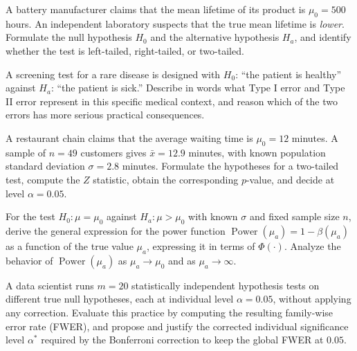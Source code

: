 \begin{problema}\label{prob:ddb67d0}
A battery manufacturer claims that the mean lifetime of its product is $\mu_0=500$ hours. An independent laboratory suspects that the true mean lifetime is \emph{lower}. Formulate the null hypothesis $H_0$ and the alternative hypothesis $H_a$, and identify whether the test is left-tailed, right-tailed, or two-tailed.
\end{problema}

\begin{problema}\label{prob:78013c6}
A screening test for a rare disease is designed with $H_0$: ``the patient is healthy'' against $H_a$: ``the patient is sick.'' Describe in words what Type I error and Type II error represent in this specific medical context, and reason which of the two errors has more serious practical consequences.
\end{problema}

\begin{problema}\label{prob:74dc84f}
A restaurant chain claims that the average waiting time is $\mu_0=12$ minutes. A sample of $n=49$ customers gives $\bar x=12.9$ minutes, with known population standard deviation $\sigma=2.8$ minutes. Formulate the hypotheses for a two-tailed test, compute the $Z$ statistic, obtain the corresponding $p$-value, and decide at level $\alpha=0.05$.
\end{problema}

\begin{problema}\label{prob:fad6841}
For the test $H_0:\mu=\mu_0$ against $H_a:\mu>\mu_0$ with known $\sigma$ and fixed sample size $n$, derive the general expression for the power function $\operatorname{Power}(\mu_a)=1-\beta(\mu_a)$ as a function of the true value $\mu_a$, expressing it in terms of $\Phi(\cdot)$. Analyze the behavior of $\operatorname{Power}(\mu_a)$ as $\mu_a\to\mu_0$ and as $\mu_a\to\infty$.
\end{problema}

\begin{problema}\label{prob:66368eb}
A data scientist runs $m=20$ statistically independent hypothesis tests on different true null hypotheses, each at individual level $\alpha=0.05$, without applying any correction. Evaluate this practice by computing the resulting family-wise error rate (FWER), and propose and justify the corrected individual significance level $\alpha^*$ required by the Bonferroni correction to keep the global FWER at $0.05$.
\end{problema}

